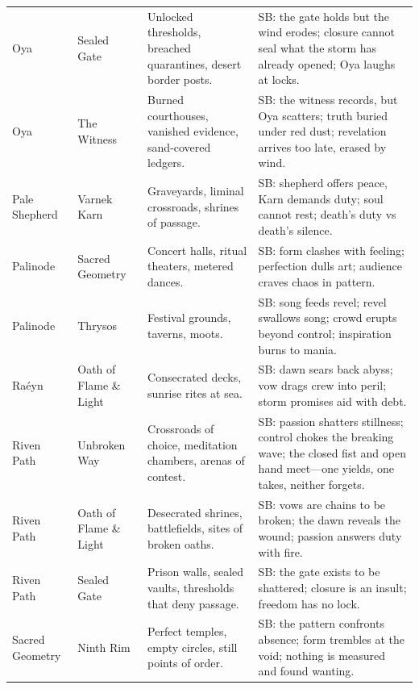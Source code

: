 \begin{longtable}{@{}p{3.3cm}p{3.3cm}p{4.6cm}p{7.2cm}@{}}
  Oya & Sealed Gate &
  Unlocked thresholds, breached quarantines, desert border posts. &
  SB: the gate holds but the wind erodes; closure cannot seal what the storm has already opened; Oya laughs at locks. \\
  
  Oya & The Witness &
  Burned courthouses, vanished evidence, sand-covered ledgers. &
  SB: the witness records, but Oya scatters; truth buried under red dust; revelation arrives too late, erased by wind. \\

  Pale Shepherd & Varnek Karn &
  Graveyards, liminal crossroads, shrines of passage. &
  SB: shepherd offers peace, Karn demands duty; soul cannot rest; death's duty vs death's silence. \\

  Palinode & Sacred Geometry &
  Concert halls, ritual theaters, metered dances. &
  SB: form clashes with feeling; perfection dulls art; audience craves chaos in pattern. \\

  Palinode & Thrysos &
  Festival grounds, taverns, moots. &
  SB: song feeds revel; revel swallows song; crowd erupts beyond control; inspiration burns to mania. \\

  Raéyn & Oath of Flame \& Light &
  Consecrated decks, sunrise rites at sea. &
  SB: dawn sears back abyss; vow drags crew into peril; storm promises aid with debt. \\

  Riven Path & Unbroken Way &
  Crossroads of choice, meditation chambers, arenas of contest. &
  SB: passion shatters stillness; control chokes the breaking wave; the closed fist and open hand meet---one yields, one takes, neither forgets. \\

  Riven Path & Oath of Flame \& Light &
  Desecrated shrines, battlefields, sites of broken oaths. &
  SB: vows are chains to be broken; the dawn reveals the wound; passion answers duty with fire. \\

  Riven Path & Sealed Gate &
  Prison walls, sealed vaults, thresholds that deny passage. &
  SB: the gate exists to be shattered; closure is an insult; freedom has no lock. \\

  Sacred Geometry & Ninth Rim &
  Perfect temples, empty circles, still points of order. &
  SB: the pattern confronts absence; form trembles at the void; nothing is measured and found wanting. \\


\end{longtable}
